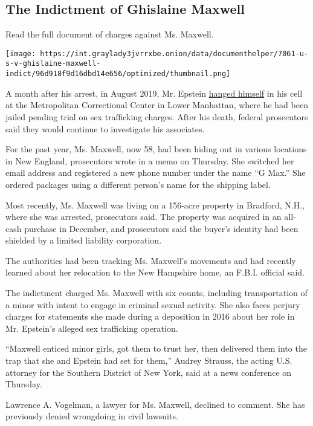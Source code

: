 \hypertarget{the-indictment-of-ghislaine-maxwell}{%
\subsection{The Indictment of Ghislaine
Maxwell}\label{the-indictment-of-ghislaine-maxwell}}

Read the full document of charges against Ms. Maxwell.

\texttt{[image: https://int.graylady3jvrrxbe.onion/data/documenthelper/7061-u-s-v-ghislaine-maxwell-indict/96d918f9d16dbd14e656/optimized/thumbnail.png]}

A month after his arrest, in August 2019, Mr. Epstein
\href{https://www.nytimes3xbfgragh.onion/2019/11/20/nyregion/jeffrey-epstein-death.html}{hanged
himself} in his cell at the Metropolitan Correctional Center in Lower
Manhattan, where he had been jailed pending trial on sex trafficking
charges. After his death, federal prosecutors said they would continue
to investigate his associates.

For the past year, Ms. Maxwell, now 58, had been hiding out in various
locations in New England, prosecutors wrote in a memo on Thursday. She
switched her email address and registered a new phone number under the
name ``G Max.'' She ordered packages using a different person's name for
the shipping label.

Most recently, Ms. Maxwell was living on a 156-acre property in
Bradford, N.H., where she was arrested, prosecutors said. The property
was acquired in an all-cash purchase in December, and prosecutors said
the buyer's identity had been shielded by a limited liability
corporation.

The authorities had been tracking Ms. Maxwell's movements and had
recently learned about her relocation to the New Hampshire home, an
F.B.I. official said.

The indictment charged Ms. Maxwell with six counts, including
transportation of a minor with intent to engage in criminal sexual
activity. She also faces perjury charges for statements she made during
a deposition in 2016 about her role in Mr. Epstein's alleged sex
trafficking operation.

``Maxwell enticed minor girls, got them to trust her, then delivered
them into the trap that she and Epstein had set for them,'' Audrey
Strauss, the acting U.S. attorney for the Southern District of New York,
said at a news conference on Thursday.

Lawrence A. Vogelman, a lawyer for Ms. Maxwell, declined to comment. She
has previously denied wrongdoing in civil lawsuits.

